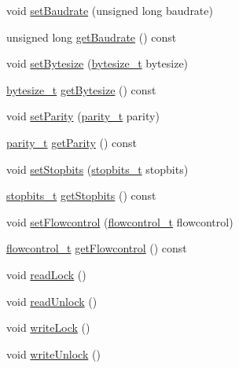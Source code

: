 \begin{DoxyCompactItemize}
\item 
void \mbox{\hyperlink{classserial_1_1serial_1_1_serial_1_1_serial_impl_ad57c0c497d487c2f2115168f60eda146}{set\+Baudrate}} (unsigned long baudrate)
\item 
unsigned long \mbox{\hyperlink{classserial_1_1serial_1_1_serial_1_1_serial_impl_a55c2c091aff0bc22c3d770fa528e0f17}{get\+Baudrate}} () const
\item 
void \mbox{\hyperlink{classserial_1_1serial_1_1_serial_1_1_serial_impl_aa788845b977360851810f07a07b340a7}{set\+Bytesize}} (\mbox{\hyperlink{namespaceserial_a00b3281fa11cea770c0b0c8a106080f8}{bytesize\+\_\+t}} bytesize)
\item 
\mbox{\hyperlink{namespaceserial_a00b3281fa11cea770c0b0c8a106080f8}{bytesize\+\_\+t}} \mbox{\hyperlink{classserial_1_1serial_1_1_serial_1_1_serial_impl_a3091d3840db8f1281bbbce78da13eaf7}{get\+Bytesize}} () const
\item 
void \mbox{\hyperlink{classserial_1_1serial_1_1_serial_1_1_serial_impl_a7859629014393110fc76a55f1d956c3f}{set\+Parity}} (\mbox{\hyperlink{namespaceserial_a8f45d26bf7c9a06659e75b5004a50481}{parity\+\_\+t}} parity)
\item 
\mbox{\hyperlink{namespaceserial_a8f45d26bf7c9a06659e75b5004a50481}{parity\+\_\+t}} \mbox{\hyperlink{classserial_1_1serial_1_1_serial_1_1_serial_impl_a3dd2675e55de5cfd2be9fd23268bf765}{get\+Parity}} () const
\item 
void \mbox{\hyperlink{classserial_1_1serial_1_1_serial_1_1_serial_impl_a23f31163c4c1b4aa488a7c7204ddec17}{set\+Stopbits}} (\mbox{\hyperlink{namespaceserial_af5b116611d6628a3aa8f788fdc09f469}{stopbits\+\_\+t}} stopbits)
\item 
\mbox{\hyperlink{namespaceserial_af5b116611d6628a3aa8f788fdc09f469}{stopbits\+\_\+t}} \mbox{\hyperlink{classserial_1_1serial_1_1_serial_1_1_serial_impl_adc56daf989276c47cff8b10564025476}{get\+Stopbits}} () const
\item 
void \mbox{\hyperlink{classserial_1_1serial_1_1_serial_1_1_serial_impl_abe20c54b814d70e1e0deaa8d3472babe}{set\+Flowcontrol}} (\mbox{\hyperlink{namespaceserial_a93ef57a314b4e562f9eded6c15d34351}{flowcontrol\+\_\+t}} flowcontrol)
\item 
\mbox{\hyperlink{namespaceserial_a93ef57a314b4e562f9eded6c15d34351}{flowcontrol\+\_\+t}} \mbox{\hyperlink{classserial_1_1serial_1_1_serial_1_1_serial_impl_aaa2af4d3b08a0f40da7527af419ec903}{get\+Flowcontrol}} () const
\item 
void \mbox{\hyperlink{classserial_1_1serial_1_1_serial_1_1_serial_impl_a284eeedc3dd686ecef0fdcfd83bebc54}{read\+Lock}} ()
\item 
void \mbox{\hyperlink{classserial_1_1serial_1_1_serial_1_1_serial_impl_ab6533e884ba609a1dd6a88b7964d8b52}{read\+Unlock}} ()
\item 
void \mbox{\hyperlink{classserial_1_1serial_1_1_serial_1_1_serial_impl_a2905e50e9082a757bfafc03356e318ed}{write\+Lock}} ()
\item 
void \mbox{\hyperlink{classserial_1_1serial_1_1_serial_1_1_serial_impl_adaec2b322f0b0793929da24f5bf09949}{write\+Unlock}} ()
\end{DoxyCompactItemize}
